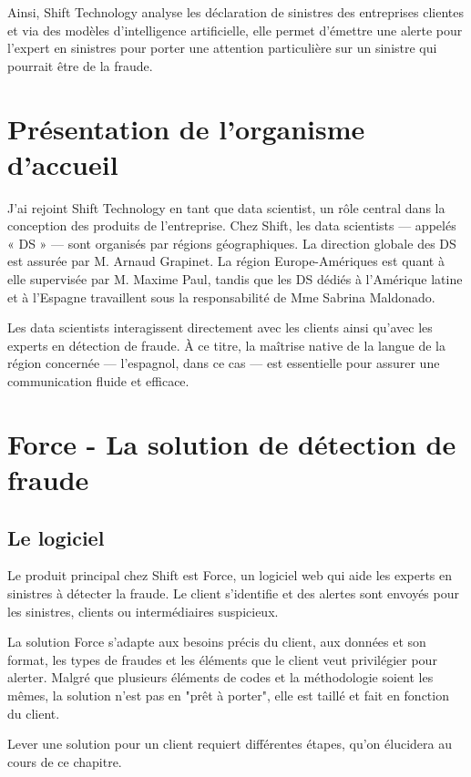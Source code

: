 \documentclass [twoside,openright,a4paper,11pt,french] {report}
\begin{document}
Ainsi, Shift Technology analyse les déclaration de sinistres des entreprises clientes 
et via des modèles d'intelligence artificielle, elle permet d'émettre une alerte pour 
l'expert en sinistres pour porter une attention particulière sur un sinistre qui pourrait être de la fraude.



\section {Présentation de l'organisme d'accueil}

J'ai rejoint Shift Technology en tant que data scientist, un rôle central dans 
la conception des produits de l'entreprise. Chez Shift, les data scientists — 
appelés « DS » — sont organisés par régions géographiques. La direction globale
des DS est assurée par M. Arnaud Grapinet. La région Europe-Amériques est quant
à elle supervisée par M. Maxime Paul, tandis que les DS dédiés à l'Amérique 
latine et à l'Espagne travaillent sous la responsabilité de Mme Sabrina Maldonado.

Les data scientists interagissent directement avec les clients ainsi qu'avec les 
experts en détection de fraude. À ce titre, la maîtrise native de la langue de la 
région concernée — l'espagnol, dans ce cas — est essentielle pour assurer une 
communication fluide et efficace.

\section {Force - La solution de détection de fraude}

\subsection{Le logiciel}
Le produit principal chez Shift est Force, un logiciel web qui aide les experts 
en sinistres à détecter la fraude. Le client s'identifie et des alertes sont 
envoyés pour les sinistres, clients ou intermédiaires suspicieux. 

La solution Force s'adapte aux besoins précis du client, aux données et son format, 
les types de fraudes et les éléments que le client veut privilégier pour alerter.
Malgré que plusieurs éléments de codes et la méthodologie soient les mêmes,
la solution n'est pas en "prêt à porter", elle est taillé et fait en fonction
du client. 

Lever une solution pour un client requiert différentes étapes, qu'on élucidera au cours de ce chapitre. 
\end{document}
